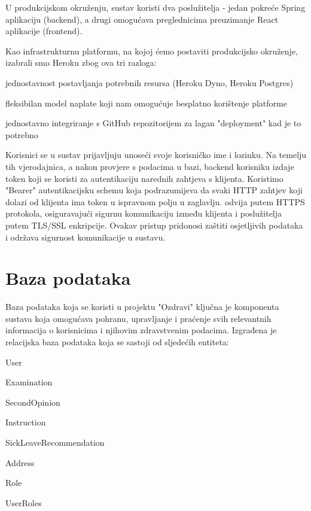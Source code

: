 		U produkcijskom okruženju, sustav koristi dva poslužitelja - jedan pokreće Spring aplikaciju (backend), a drugi omogućava preglednicima preuzimanje React aplikacije (frontend).

		Kao infrastrukturnu platformu, na kojoj ćemo postaviti produkcijsko okruženje, izabrali smo Heroku zbog ova tri razloga:
		\begin{packed_item}
			\item jednostavnost postavljanja potrebnih resursa (Heroku Dyno, Heroku Postgres)
			\item fleksibilan model naplate koji nam omogućuje besplatno korištenje platforme
			\item jednostavno integriranje s GitHub repozitorijem za lagan "deployment" kad je to potrebno
		\end{packed_item}

		Korisnici se u sustav prijavljuju unoseći svoje korisničko ime i lozinku. Na temelju tih vjerodajnica, a nakon provjere s podacima u bazi, backend korisniku izdaje token koji se koristi za autentikaciju narednih zahtjeva s klijenta.
		Koristimo "Bearer" autentikacijsku schemu koja podrazumijeva da svaki HTTP zahtjev koji dolazi od klijenta ima token u ispravnom polju u zaglavlju. odvija putem HTTPS protokola, osiguravajući sigurnu komunikaciju između klijenta i poslužitelja putem TLS/SSL enkripcije. Ovakav pristup pridonosi zaštiti osjetljivih podataka i održava sigurnost komunikacije u sustavu.
					
		\section{Baza podataka}
        Baza podataka koja se koristi u projektu "Ozdravi" ključna je komponenta sustava koja omogućava pohranu, upravljanje i praćenje svih relevantnih informacija o korisnicima i njihovim zdravstvenim podacima. 
		Izgrađena je relacijska baza podataka koja se sastoji od sljedećih entiteta:
		\begin{packed_item}
			\item User
			\item Examination
			\item SecondOpinion
			\item Instruction
			\item SickLeaveRecommendation
			\item Address
			\item Role
			\item UserRoles
		\end{packed_item}

